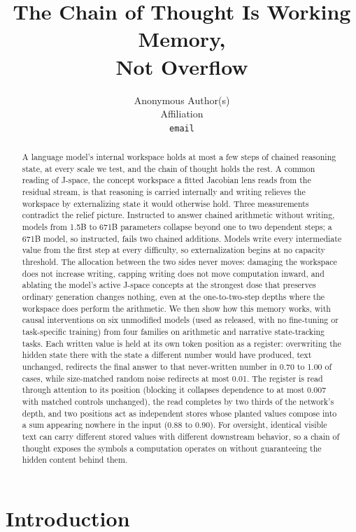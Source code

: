 \documentclass{article}
\title{The Chain of Thought Is Working Memory,\\Not Overflow}
\author{%
  Anonymous Author(s)\\
  Affiliation\\
  \texttt{email}\\
}
\begin{document}
\maketitle

\begin{abstract}
A language model's internal workspace holds at most a few steps of chained reasoning state, at every scale we test, and the chain of thought holds the rest. A common reading of J-space, the concept workspace a fitted Jacobian lens reads from the residual stream, is that reasoning is carried internally and writing relieves the workspace by externalizing state it would otherwise hold. Three measurements contradict the relief picture. Instructed to answer chained arithmetic without writing, models from 1.5B to 671B parameters collapse beyond one to two dependent steps; a 671B model, so instructed, fails two chained additions. Models write every intermediate value from the first step at every difficulty, so externalization begins at no capacity threshold. The allocation between the two sides never moves: damaging the workspace does not increase writing, capping writing does not move computation inward, and ablating the model's active J-space concepts at the strongest dose that preserves ordinary generation changes nothing, even at the one-to-two-step depths where the workspace does perform the arithmetic. We then show how this memory works, with causal interventions on six unmodified models (used as released, with no fine-tuning or task-specific training) from four families on arithmetic and narrative state-tracking tasks. Each written value is held at its own token position as a register: overwriting the hidden state there with the state a different number would have produced, text unchanged, redirects the final answer to that never-written number in 0.70 to 1.00 of cases, while size-matched random noise redirects at most 0.01. The register is read through attention to its position (blocking it collapses dependence to at most 0.007 with matched controls unchanged), the read completes by two thirds of the network's depth, and two positions act as independent stores whose planted values compose into a sum appearing nowhere in the input (0.88 to 0.90). For oversight, identical visible text can carry different stored values with different downstream behavior, so a chain of thought exposes the symbols a computation operates on without guaranteeing the hidden content behind them.
\end{abstract}

\section{Introduction}
\end{document}
